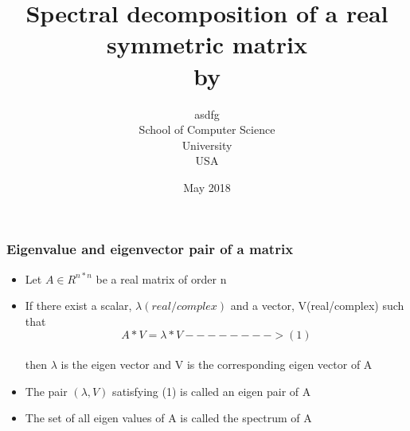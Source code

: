 \documentclass{beamer}
\title[Spectral decomposition of a real symmetric matrix]{Spectral decomposition of a real symmetric matrix \\ by}
\author[asdfg]{asdfg
\\School of Computer Science
\\University
\\USA
}
\date{May 2018}
\begin{document}
\begin{frame}
\titlepage
\end{frame}

\begin{frame}
\frametitle{Eigenvalue and eigenvector pair of a matrix}
\begin{itemize}
    \item Let \(A\in R^{n*n}\) be a real matrix of order n
    \item If there exist a scalar, \(\lambda(real/complex)\) and a vector,                  V(real/complex) such that 
        \\  \[A*V= \lambda*V-------->(1)\]\\ then \(\lambda\) is the eigen vector and V is the corresponding eigen vector of A
    \item The pair \((\lambda, V)\) satisfying (1) is called an eigen pair of A
    \item The set of all eigen values of A is called the spectrum of A
\end{itemize}
\end{frame}
\end{document}
